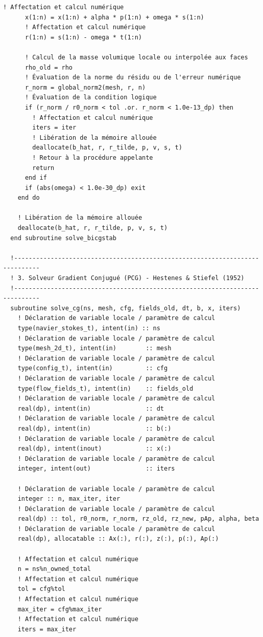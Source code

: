 \documentclass[10pt,a4paper,oneside]{book}
\begin{document}
\begin{lstlisting}[language={[95]Fortran}]
      ! Affectation et calcul numérique
      x(1:n) = x(1:n) + alpha * p(1:n) + omega * s(1:n)
      ! Affectation et calcul numérique
      r(1:n) = s(1:n) - omega * t(1:n)

      ! Calcul de la masse volumique locale ou interpolée aux faces
      rho_old = rho
      ! Évaluation de la norme du résidu ou de l'erreur numérique
      r_norm = global_norm2(mesh, r, n)
      ! Évaluation de la condition logique
      if (r_norm / r0_norm < tol .or. r_norm < 1.0e-13_dp) then
        ! Affectation et calcul numérique
        iters = iter
        ! Libération de la mémoire allouée
        deallocate(b_hat, r, r_tilde, p, v, s, t)
        ! Retour à la procédure appelante
        return
      end if
      if (abs(omega) < 1.0e-30_dp) exit
    end do

    ! Libération de la mémoire allouée
    deallocate(b_hat, r, r_tilde, p, v, s, t)
  end subroutine solve_bicgstab

  !-----------------------------------------------------------------------------
  ! 3. Solveur Gradient Conjugué (PCG) - Hestenes & Stiefel (1952)
  !-----------------------------------------------------------------------------
  subroutine solve_cg(ns, mesh, cfg, fields_old, dt, b, x, iters)
    ! Déclaration de variable locale / paramètre de calcul
    type(navier_stokes_t), intent(in) :: ns
    ! Déclaration de variable locale / paramètre de calcul
    type(mesh_2d_t), intent(in)        :: mesh
    ! Déclaration de variable locale / paramètre de calcul
    type(config_t), intent(in)         :: cfg
    ! Déclaration de variable locale / paramètre de calcul
    type(flow_fields_t), intent(in)    :: fields_old
    ! Déclaration de variable locale / paramètre de calcul
    real(dp), intent(in)               :: dt
    ! Déclaration de variable locale / paramètre de calcul
    real(dp), intent(in)               :: b(:)
    ! Déclaration de variable locale / paramètre de calcul
    real(dp), intent(inout)            :: x(:)
    ! Déclaration de variable locale / paramètre de calcul
    integer, intent(out)               :: iters

    ! Déclaration de variable locale / paramètre de calcul
    integer :: n, max_iter, iter
    ! Déclaration de variable locale / paramètre de calcul
    real(dp) :: tol, r0_norm, r_norm, rz_old, rz_new, pAp, alpha, beta
    ! Déclaration de variable locale / paramètre de calcul
    real(dp), allocatable :: Ax(:), r(:), z(:), p(:), Ap(:)

    ! Affectation et calcul numérique
    n = ns%n_owned_total
    ! Affectation et calcul numérique
    tol = cfg%tol
    ! Affectation et calcul numérique
    max_iter = cfg%max_iter
    ! Affectation et calcul numérique
    iters = max_iter


\end{lstlisting}
\end{document}
